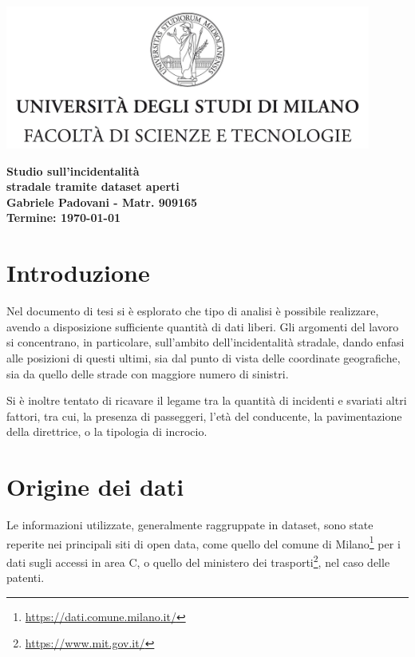 \documentclass[a4paper]{article}
\begin{document}
\begin{center}
    \includegraphics[width=0.9\textwidth]{../tesi/Logo.jpg}
\end{center}
\vspace{3mm}
\begin{center}
    {\huge{\bf Studio sull'incidentalità}}\\
    \vspace{2mm}
    {\huge{\bf stradale tramite dataset aperti}}\\
    \vspace{3mm}
    {\bf Gabriele Padovani - Matr. 909165}\\
    \vspace{3mm}
    {\bf Termine: \today}\\
\end{center}

\section{Introduzione}

Nel documento di tesi si è esplorato che tipo di analisi è possibile realizzare, 
avendo a disposizione sufficiente quantità di dati liberi. 
Gli argomenti del lavoro si concentrano, in particolare, sull'ambito dell'incidentalità 
stradale, dando enfasi alle posizioni di questi ultimi, sia dal punto di vista delle coordinate 
geografiche, sia da quello delle strade con maggiore numero di sinistri. 

Si è inoltre tentato di ricavare il legame tra la quantità di incidenti e svariati altri 
fattori, tra cui, la presenza di passeggeri, l'età del conducente, 
la pavimentazione della direttrice, o la tipologia di incrocio.

\section{Origine dei dati}

Le informazioni utilizzate, generalmente raggruppate in dataset, sono 
state reperite nei principali siti di open data, come quello del comune di 
Milano\footnote{\url{https://dati.comune.milano.it/}} per i dati sugli accessi in area C, 
o quello del ministero dei trasporti\footnote{\url{https://www.mit.gov.it/}}, 
nel caso delle patenti.
\end{document}
